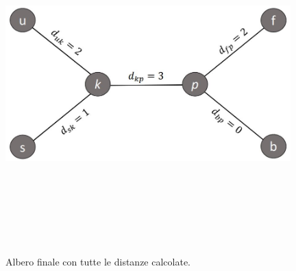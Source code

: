 \begin{figure}[h!]
\centering
	\includegraphics[height=13cm, width=11cm, keepaspectratio]{distance_between_s_u_part_4.jpg}
 	\caption{Albero finale con tutte le distanze calcolate.}
  	\label{fig:neighborsleaves_4}
\end{figure}